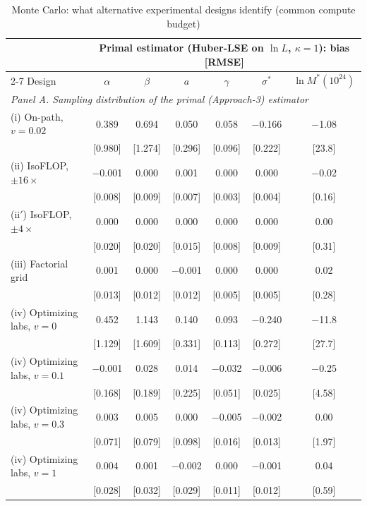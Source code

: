 \begin{table}[!htbp]
\centering
\begin{threeparttable}
\caption{Monte Carlo: what alternative experimental designs identify (common compute budget)}
\label{tab:mc_designs}
\small
\begin{tabular}{lcccccc}
\toprule
 & \multicolumn{6}{c}{Primal estimator (Huber-LSE on $\ln L$, $\kappa=1$): bias [RMSE]} \\
\cmidrule(lr){2-7}
Design & $\alpha$ & $\beta$ & $a$ & $\gamma$ & $\sigma^*$ & $\ln M^*(10^{24})$ \\
\midrule
\multicolumn{7}{l}{\textit{Panel A. Sampling distribution of the primal (Approach-3) estimator}} \\
(i) On-path, $v=0.02$ & 0.389 & 0.694 & 0.050 & 0.058 & $-$0.166 & $-$1.08 \\
 & [0.980] & [1.274] & [0.296] & [0.096] & [0.222] & [23.8] \\[2pt]
(ii) IsoFLOP, $\pm16\times$ & $-$0.001 & 0.000 & 0.001 & 0.000 & 0.000 & $-$0.02 \\
 & [0.008] & [0.009] & [0.007] & [0.003] & [0.004] & [0.16] \\[2pt]
(ii$'$) IsoFLOP, $\pm4\times$ & 0.000 & 0.000 & 0.000 & 0.000 & 0.000 & 0.00 \\
 & [0.020] & [0.020] & [0.015] & [0.008] & [0.009] & [0.31] \\[2pt]
(iii) Factorial grid & 0.001 & 0.000 & $-$0.001 & 0.000 & 0.000 & 0.02 \\
 & [0.013] & [0.012] & [0.012] & [0.005] & [0.005] & [0.28] \\[2pt]
(iv) Optimizing labs, $v=0$ & 0.452 & 1.143 & 0.140 & 0.093 & $-$0.240 & $-$11.8 \\
 & [1.129] & [1.609] & [0.331] & [0.113] & [0.272] & [27.7] \\[2pt]
(iv) Optimizing labs, $v=0.1$ & $-$0.001 & 0.028 & 0.014 & $-$0.032 & $-$0.006 & $-$0.25 \\
 & [0.168] & [0.189] & [0.225] & [0.051] & [0.025] & [4.58] \\[2pt]
(iv) Optimizing labs, $v=0.3$ & 0.003 & 0.005 & 0.000 & $-$0.005 & $-$0.002 & 0.00 \\
 & [0.071] & [0.079] & [0.098] & [0.016] & [0.013] & [1.97] \\[2pt]
(iv) Optimizing labs, $v=1$ & 0.004 & 0.001 & $-$0.002 & 0.000 & $-$0.001 & 0.04 \\
 & [0.028] & [0.032] & [0.029] & [0.011] & [0.012] & [0.59] \\[2pt]

\end{tabular}
\end{threeparttable}
\end{table}
